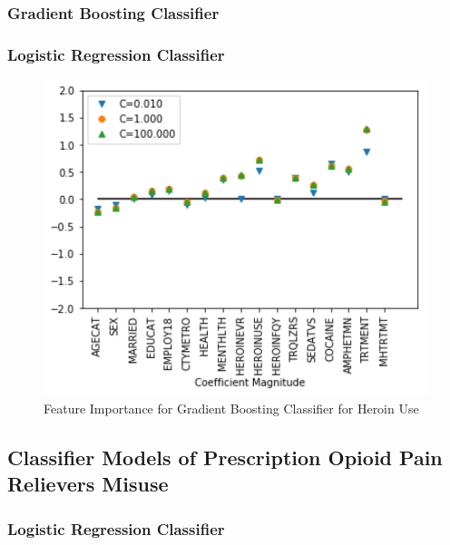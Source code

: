 \documentclass[sigconf]{acmart}
\begin{document}
\subsubsection{Gradient Boosting Classifier\cite{muller17}}

\subsubsection{Logistic Regression Classifier\cite{muller17}}

\begin{figure}[!ht]
  \centering\includegraphics[width=\columnwidth]{images/Figure9.pdf}
  \caption{Feature Importance for Gradient Boosting Classifier for Heroin Use}
  \label{f:Figure8}
\end{figure}

\subsection{Classifier Models of Prescription Opioid Pain Relievers Misuse}

\subsubsection{Logistic Regression Classifier\cite{muller17}}
\end{document}
